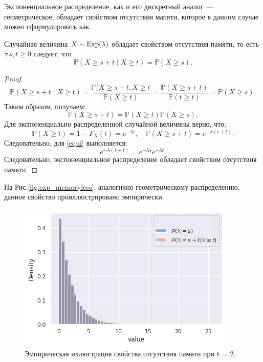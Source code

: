 Экспоненциальное распределение, как и его дискретный аналог --- геометрическое,
 обладает свойством отсутствия мапяти, которое в данном случае можно сформулировать
 как
\begin{statement}
	Случайная величина $X\sim \operatorname{\mathrm{Exp}}(\lambda)$ обладает свойством отсутствия памяти,
     то есть $ \forall s,t \ge 0 $ следует, что
	\begin{equation}\label{expmem}
	    \mathbb{P} (X \ge s + t \mid X \ge t) = \mathbb{P} (X \ge s). 
	\end{equation}
\end{statement}
\begin{proof}
	$$
	\mathbb{P}(X \ge s + t \mid X \ge t) = \frac{\mathbb{P}(X \ge s + t, X \ge t}
	 {\mathbb{P}(X \ge t)} = \frac{\mathbb{P} (X \ge s + t)}{\mathbb{P}(t \ge t)}
	 = \mathbb{P}(X \ge s). 
	$$
	Таким образом, получаем:
	\begin{equation}
		\mathbb{P}(X\ge s+t)=\mathbb{P}(X\ge t)\mathbb{P}(X\ge s). \label{equi}
	\end{equation}
	Для экспоненциально распределенной случайной величины верно, что:
	$$
	\mathbb{P} (X \ge t) = 1 - F_X(t) = e^{-\lambda t}, \quad
	\mathbb{P} (X \ge s + t) = e^{-\lambda(s + t)}.
	$$
	Следовательно, для \eqref{equi} выполняется:
	$$
	e^{-\lambda(s + t)} = e^{-\lambda s} e^{-\lambda t}.
	$$
	Следовательно, экспоненциальное распределение обладает свойством отсутствия
	 памяти.
\end{proof}
На Рис.\eqref{fig:exp_memoryless}, аналогично геометрическому распределению,
 данное свойство проиллюстрировано эмпирически.
\begin{figure}[ht]
	\centering
	\includegraphics[width = 0.8\linewidth]{"./resources/exp_memoryless.png"}
	\caption{Эмпирическая иллюстрация свойства отсутствия памяти при t = 2.}
    \label{fig:exp_memoryless}
\end{figure}

